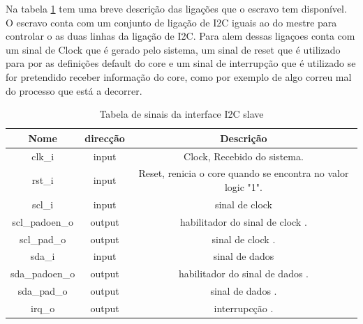 Na tabela \ref{table:slave} tem uma breve descrição das ligações que o escravo tem disponível. O escravo conta com um conjunto de ligação de I2C iguais ao do mestre para controlar o as duas linhas da ligação de I2C. Para alem dessas ligaçoes conta com um sinal de Clock que é gerado pelo sistema, um sinal de reset que é utilizado para por as definições default do core e um sinal de interrupção que é utilizado se for pretendido receber informação do core, como por exemplo de algo correu mal do processo que está a decorrer.

\begin{table}[h!]
  \begin{center}
    \begin{tabular}{|c|c|c|}
      \hline
      Nome & direcção & Descrição \\
      \hline \hline
      clk\_i & input & Clock, Recebido do sistema. \\
      \hline
      rst\_i & input & Reset, renicia o core quando se encontra no valor logic "1".\\
      \hline
      scl\_i & input & sinal de clock\\
      \hline
      scl\_padoen\_o & output & habilitador do sinal de clock .\\
      \hline
      scl\_pad\_o & output & sinal de clock .\\
      \hline
      sda\_i & input & sinal de dados\\
      \hline
      sda\_padoen\_o & output & habilitador do sinal de dados .\\
      \hline
      sda\_pad\_o & output & sinal de dados .\\
      \hline
      irq\_o & output & interrupcção .\\
      \hline
    \end{tabular}
  \end{center}
  \caption[Tabela de sinais do core I2C slave]{Tabela de sinais da interface I2C slave}
  \label{table:slave}
\end{table}

